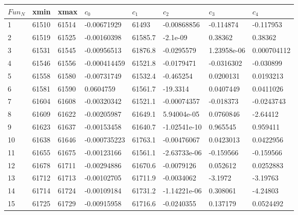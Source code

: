 \begin{itemize}
\vspace{-0.2in}
\begin {table}[!h]
\begin{center}
\begin{tabular}{|l|l|l|l|l|l|l|l|}
\hline
$Fun_{N}$ & xmin  &   xmax    &  $c_{0}$     &   $c_{1}$    &  $c_{2}$      &   $c_{3}$  &   $c_{4}$\\
\hline
1  &  61510    & 61514   &  -0.00671929   &  61493     & -0.00868856    &   -0.114874  &  -0.117953\\
\hline
2   &  61519   &  61525  &    -0.00160398   &  61585.7  &  -2.1e-09    &   0.38362    &  0.38362\\
\hline
3   &  61531   &  61545  &    -0.00956513   &  61876.8  & -0.0295579   &    1.23958e-06 &  0.000704112\\
\hline
4   &  61546   &  61556  &    -0.000414459  &   61521.8  &-0.0179471   &    -0.0316302  &  -0.030899\\
\hline
5   &  61558   &  61580  &    -0.00731749  &   61532.4 &  -0.465254   &    0.0200131   &   0.0193213\\
\hline
6   &  61581   & 61590   &   0.0604759    & 61561.7  & -19.3314    & 0.0407449   & 0.0411026\\
\hline
7   &  61604   & 61608    &  -0.00320342  &   61521.1  &  -0.00074357   &    -0.018373  &    -0.0243743\\
\hline
8   &  61609   & 61622     & -0.00205987  &   61649.1  &   5.94004e-05   &    0.0760846  &    -2.64412\\
\hline
9   &  61623   & 61637    &  -0.00153458  &   61640.7  &   -1.02541e-10 &   0.965545   &   0.959411\\
\hline
10  &   61638   &  61646  &    -0.000735223  &   61763.1  & -0.00476067   & 0.0423013  &    0.0422956\\
\hline
11  &   61655  &  61675   &   -0.00123166   &  61561.1  &  -2.63733e-06  &  -0.159566  &    -0.159566\\
\hline
12  &  61678    & 61711   &   -0.00294886   &  61670.6   & -0.0079126   &    0.052612  &    0.0252883\\
\hline
13   &  61712   &  61713   &   -0.00102705   &  61711.9 &   -0.0034062 &  -3.1972   &   -3.19763\\
\hline
14   &  61714   &  61724   &   -0.00109184   &  61731.2&    -1.14221e-06  &     0.308061   &-4.24803\\
\hline
15   &  61725   &  61729   &   -0.00915958   &  61716.6 &     -0.0240355 &      0.137179  & 0.0524492\\

\end{tabular}
\end{center}
\end{table}
\end{itemize}
